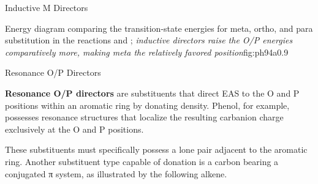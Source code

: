 \begin{core}{Inductive M Directors}
{\begin{scope}[xshift=9cm]
          \end{scope}
        }{Energy diagram comparing the transition-state energies for meta, ortho, and para substitution in the reactions  and ; \textit{inductive directors raise the O/P energies comparatively more, making meta the relatively favored position}}{fig:ph94a}{0.9}

      \end{core}

      \begin{core}{Resonance O/P Directors}

        \textbf{Resonance O/P directors} are substituents that direct EAS to the O and P positions within an aromatic ring by donating  density. Phenol, for example, possesses resonance structures that localize the resulting carbanion charge exclusively at the O and P positions.


        These substituents must specifically possess a lone pair adjacent to the aromatic ring. Another substituent type capable of  donation is a carbon bearing a conjugated π system, as illustrated by the following alkene.


\end{core}
